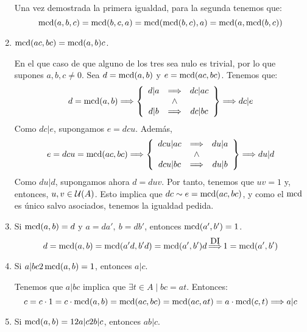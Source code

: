 \begin{enumerate}
    Una vez demostrada la primera igualdad, para la segunda tenemos que:
    $$\operatorname{mcd}(a,b,c) = \operatorname{mcd}(b,c,a) = \operatorname{mcd}(\operatorname{mcd}(b,c), a) = \operatorname{mcd}(a, \operatorname{mcd}(b,c))$$

    \item $\operatorname{mcd}(ac,bc) = \operatorname{mcd}(a,b)c$.

    En el que caso de que alguno de los tres sea nulo es trivial, por lo que supones $a,b,c\neq 0$. Sea $d=\operatorname{mcd}(a,b)$ y $e=\operatorname{mcd}(ac,bc)$. Tenemos que:
    \begin{equation*}
        d=\operatorname{mcd}(a,b) \Longrightarrow \left\{
        \begin{array}{ccc}
            d|a & \Longrightarrow & dc|ac  \\
            &\land& \\
            d|b & \Longrightarrow & dc|bc  \\
        \end{array}
        \right\} \Longrightarrow dc|e
    \end{equation*}
    Como $dc|e$, supongamos $e=dcu$. Además, 
    \begin{equation*}
        e=dcu=\operatorname{mcd}(ac,bc) \Longrightarrow \left\{
        \begin{array}{ccc}
            dcu|ac & \Longrightarrow & du|a  \\
            &\land& \\
            dcu|bc & \Longrightarrow & du|b  \\
        \end{array}
        \right\} \Longrightarrow du|d
    \end{equation*}
    Como $du|d$, supongamos ahora $d=duv$. Por tanto, tenemos que $uv=1$ y, entonces, $u,v\in \mathcal{U}(A)$. Esto implica que $dc\sim e=\operatorname{mcd}(ac,bc)$, y como el $\operatorname{mcd}$ es único salvo asociados, tenemos la igualdad pedida.

    \item Si $\operatorname{mcd}(a,b)=d$ y $a=da',~ b=db'$, entonces $\operatorname{mcd}(a',b')=1$.
    $$d = \operatorname{mcd}(a,b) = \operatorname{mcd}(a'd, b'd) = \operatorname{mcd}(a',b')d \mathop{\Longrightarrow}^{\mbox{DI}} 1=\operatorname{mcd}(a',b')$$

    \item Si $a|bc 2 \operatorname{mcd}(a,b)=1$, entonces $a|c$.

    Tenemos que $a|bc$ implica que $\exists t \in A \mid bc=at$. Entonces:
    $$c= c \cdot 1 = c \cdot \operatorname{mcd}(a,b) = \operatorname{mcd}(ac, bc) = \operatorname{mcd}(ac, at) = a \cdot \operatorname{mcd}(c,t) \Longrightarrow a|c$$

    \item Si $\operatorname{mcd}(a,b)=1 2 a|c 2 b|c$, entonces $ab|c$.


\end{enumerate}
